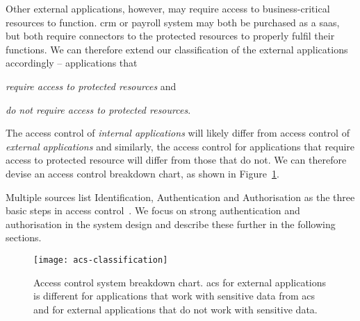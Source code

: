 Other external applications, however, may require access to business-critical resources to function. \acrlong{crm} or payroll system may both be purchased as a \acrshort{saas}, but both require connectors to the protected resources to properly fulfil their functions. We can therefore extend our classification of the external applications accordingly -- applications that
\begin{enumerate*}[label=(\roman*)]
    \item \textit{require access to protected resources} and
    \item \textit{do not require access to protected resources}.
\end{enumerate*}

The access control of \textit{internal applications} will likely differ from access control of \textit{external applications} and similarly, the access control for applications that require access to protected resource will differ from those that do not. We can therefore devise an access control breakdown chart, as shown in Figure~\ref{fig:acs-classification}. 

Multiple sources list Identification, Authentication and Authorisation as the three basic steps in access control~\cite{Harris2008CISSPGuide, 2018AccessSystems, 2003IdentificationAuthorization}. We focus on strong authentication and authorisation in the system design and describe these further in the following sections.

\begin{figure}[ht]
    \centering
    \texttt{[image: acs-classification]}
    \caption{Access control system breakdown chart. \acrshort{acs} for external applications is different for applications that work with sensitive data from \acrshort{acs} and for external applications that do not work with sensitive data.}
    \label{fig:acs-classification}
\end{figure}








\restoregeometry

